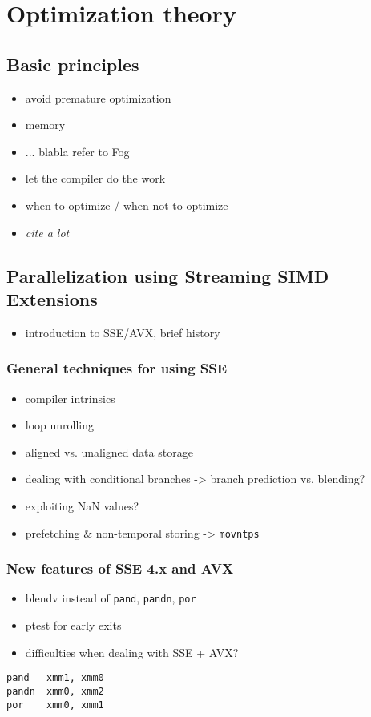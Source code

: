 \section{Optimization theory}
\label{Optimization_theory}
\subsection{Basic principles}
\begin{itemize}
\item avoid premature optimization
\item memory
\item ... blabla refer to Fog
\item let the compiler do the work
\item when to optimize / when not to optimize
\item \emph{cite a lot}
\end{itemize}
\subsection{Parallelization using Streaming SIMD Extensions}
\begin{itemize}
\item introduction to SSE/AVX, brief history
\end{itemize}
\subsubsection{General techniques for using SSE}
\begin{itemize}
\item compiler intrinsics
\item loop unrolling
\item aligned vs. unaligned data storage
\item dealing with conditional branches -> branch prediction vs. blending?
\item exploiting NaN values?
\item prefetching \& non-temporal storing -> \texttt{movntps}
\end{itemize}
\subsubsection{New features of SSE 4.x and AVX}
\begin{itemize}
\item blendv instead of \texttt{pand}, \texttt{pandn}, \texttt{por}
\item ptest for early exits
\item difficulties when dealing with SSE + AVX?
\end{itemize}
\lstset{language=XML,}
\begin{lstlisting}
pand   xmm1, xmm0
pandn  xmm0, xmm2
por    xmm0, xmm1
\end{lstlisting}

